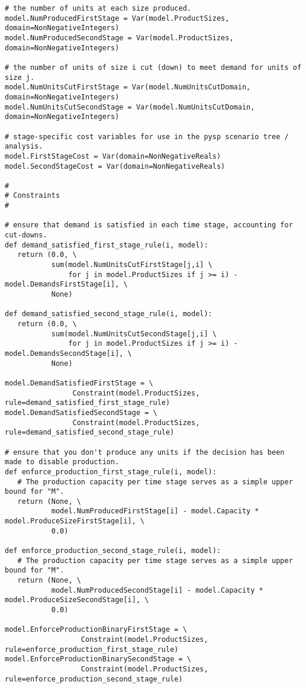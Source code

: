 {\begin{verbatim}
# the number of units at each size produced.
model.NumProducedFirstStage = Var(model.ProductSizes, domain=NonNegativeIntegers)
model.NumProducedSecondStage = Var(model.ProductSizes, domain=NonNegativeIntegers)

# the number of units of size i cut (down) to meet demand for units of size j.
model.NumUnitsCutFirstStage = Var(model.NumUnitsCutDomain, domain=NonNegativeIntegers)
model.NumUnitsCutSecondStage = Var(model.NumUnitsCutDomain, domain=NonNegativeIntegers)

# stage-specific cost variables for use in the pysp scenario tree / analysis.
model.FirstStageCost = Var(domain=NonNegativeReals)
model.SecondStageCost = Var(domain=NonNegativeReals)

#
# Constraints
#

# ensure that demand is satisfied in each time stage, accounting for cut-downs.
def demand_satisfied_first_stage_rule(i, model):
   return (0.0, \
           sum(model.NumUnitsCutFirstStage[j,i] \
               for j in model.ProductSizes if j >= i) - model.DemandsFirstStage[i], \
           None)

def demand_satisfied_second_stage_rule(i, model):
   return (0.0, \
           sum(model.NumUnitsCutSecondStage[j,i] \
               for j in model.ProductSizes if j >= i) - model.DemandsSecondStage[i], \
           None)

model.DemandSatisfiedFirstStage = \
                Constraint(model.ProductSizes, rule=demand_satisfied_first_stage_rule)
model.DemandSatisfiedSecondStage = \
                Constraint(model.ProductSizes, rule=demand_satisfied_second_stage_rule)

# ensure that you don't produce any units if the decision has been made to disable production.
def enforce_production_first_stage_rule(i, model):
   # The production capacity per time stage serves as a simple upper bound for "M".
   return (None, \
           model.NumProducedFirstStage[i] - model.Capacity * model.ProduceSizeFirstStage[i], \
           0.0)

def enforce_production_second_stage_rule(i, model):
   # The production capacity per time stage serves as a simple upper bound for "M".   
   return (None, \
           model.NumProducedSecondStage[i] - model.Capacity * model.ProduceSizeSecondStage[i], \
           0.0)

model.EnforceProductionBinaryFirstStage = \
                  Constraint(model.ProductSizes, rule=enforce_production_first_stage_rule)
model.EnforceProductionBinarySecondStage = \
                  Constraint(model.ProductSizes, rule=enforce_production_second_stage_rule)


\end{verbatim}}
